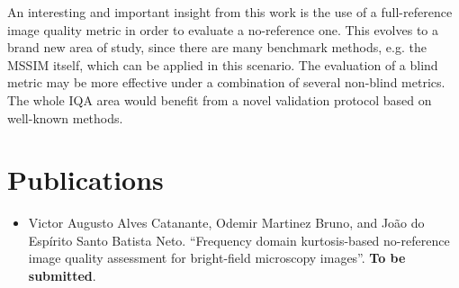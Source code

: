 An interesting and important insight from this work is the use of a full-reference image quality metric in order to evaluate a no-reference one. This evolves to a brand new area of study, since there are many benchmark methods, e.g. the MSSIM itself, which can be applied in this scenario. The evaluation of a blind metric may be more effective under a combination of several non-blind metrics. The whole IQA area would benefit from a novel validation protocol based on well-known methods.


\section*{Publications}

\begin{itemize}
    \item \cite{catanante2020frequency} Victor Augusto Alves Catanante, Odemir Martinez Bruno, and João do Espírito Santo Batista Neto. ``Frequency domain kurtosis-based no-reference image quality assessment for bright-field microscopy images''. \textbf{To be submitted}.
\end{itemize}
